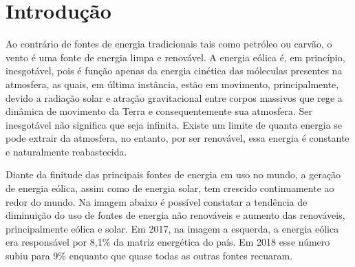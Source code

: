 \documentclass[
	12pt,				%
	openright,			%
	oneside,			%
	a4paper,			%
	english,			%
	french,				%
	spanish,			%
	brazil				%
	]{abntex2}
\begin{document}
\chapter*[Introdução]{Introdução}



Ao contrário de fontes de energia tradicionais tais como petróleo ou carvão, o vento é uma fonte de energia limpa e renovável. A energia eólica é, em princípio, inesgotável, pois é função apenas da energia cinética das móleculas presentes na atmosfera, as quais, em última instância, estão em movimento, principalmente, devido a radiação solar e atração gravitacional entre corpos massivos que rege a dinâmica de movimento da Terra e consequentemente sua atmosfera. Ser inesgotável não significa que seja infinita. Existe um limite de quanta energia se pode extrair da atmosfera, no entanto, por ser renovável, essa energia é constante e naturalmente reabastecida.

Diante da finitude das principais fontes de energia em uso no mundo, a geração de energia eólica, assim como de energia solar, tem crescido continuamente ao redor do mundo. Na imagem abaixo é possível constatar a tendência de diminuição do uso de fontes de energia não renováveis e aumento das renováveis, principalmente eólica e solar. Em 2017, na imagem a esquerda, a energia eólica era responsável por 8,1\% da matriz energética do país. Em 2018 esse número subiu para 9\% enquanto que quase todas as outras fontes recuaram.
\end{document}
